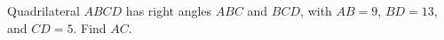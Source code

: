 Quadrilateral $ABCD$ has right angles $ABC$ and $BCD$, with $AB=9$, $BD=13$, and $CD=5$. Find $AC$.
